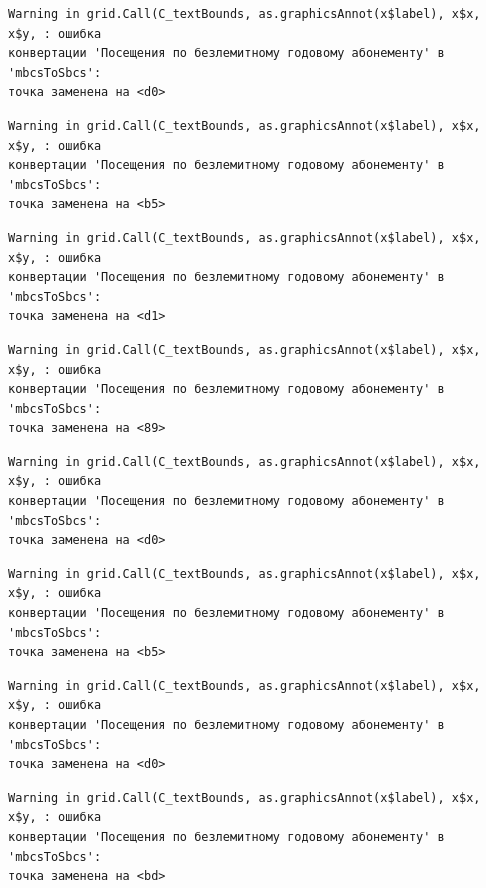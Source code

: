 \documentclass[
  letterpaper,
  DIV=11,
  numbers=noendperiod]{scrreprt}
\begin{document}
\begin{verbatim}
Warning in grid.Call(C_textBounds, as.graphicsAnnot(x$label), x$x, x$y, : ошибка
конвертации 'Посещения по безлемитному годовому абонементу' в 'mbcsToSbcs':
точка заменена на <d0>
\end{verbatim}

\begin{verbatim}
Warning in grid.Call(C_textBounds, as.graphicsAnnot(x$label), x$x, x$y, : ошибка
конвертации 'Посещения по безлемитному годовому абонементу' в 'mbcsToSbcs':
точка заменена на <b5>
\end{verbatim}

\begin{verbatim}
Warning in grid.Call(C_textBounds, as.graphicsAnnot(x$label), x$x, x$y, : ошибка
конвертации 'Посещения по безлемитному годовому абонементу' в 'mbcsToSbcs':
точка заменена на <d1>
\end{verbatim}

\begin{verbatim}
Warning in grid.Call(C_textBounds, as.graphicsAnnot(x$label), x$x, x$y, : ошибка
конвертации 'Посещения по безлемитному годовому абонементу' в 'mbcsToSbcs':
точка заменена на <89>
\end{verbatim}

\begin{verbatim}
Warning in grid.Call(C_textBounds, as.graphicsAnnot(x$label), x$x, x$y, : ошибка
конвертации 'Посещения по безлемитному годовому абонементу' в 'mbcsToSbcs':
точка заменена на <d0>
\end{verbatim}

\begin{verbatim}
Warning in grid.Call(C_textBounds, as.graphicsAnnot(x$label), x$x, x$y, : ошибка
конвертации 'Посещения по безлемитному годовому абонементу' в 'mbcsToSbcs':
точка заменена на <b5>
\end{verbatim}

\begin{verbatim}
Warning in grid.Call(C_textBounds, as.graphicsAnnot(x$label), x$x, x$y, : ошибка
конвертации 'Посещения по безлемитному годовому абонементу' в 'mbcsToSbcs':
точка заменена на <d0>
\end{verbatim}

\begin{verbatim}
Warning in grid.Call(C_textBounds, as.graphicsAnnot(x$label), x$x, x$y, : ошибка
конвертации 'Посещения по безлемитному годовому абонементу' в 'mbcsToSbcs':
точка заменена на <bd>
\end{verbatim}
\end{document}
